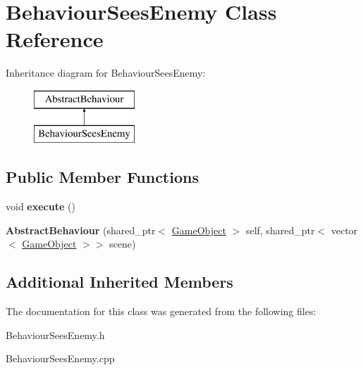 \hypertarget{class_behaviour_sees_enemy}{}\section{Behaviour\+Sees\+Enemy Class Reference}
\label{class_behaviour_sees_enemy}
Inheritance diagram for Behaviour\+Sees\+Enemy\+:\begin{figure}[H]
\begin{center}
\leavevmode
\includegraphics[height=2.000000cm]{class_behaviour_sees_enemy}
\end{center}
\end{figure}
\subsection*{Public Member Functions}
\begin{DoxyCompactItemize}
\item 
\mbox{\label{class_behaviour_sees_enemy_afddbf2ca7396c9fd7b24f4be60edb84c}} 
void {\bfseries execute} ()
\item 
\mbox{\label{class_behaviour_sees_enemy_a8a3a9217b3179f949a1d6a32f340c00c}} 
{\bfseries Abstract\+Behaviour} (shared\+\_\+ptr$<$ \mbox{\hyperlink{class_game_object}{Game\+Object}} $>$ self, shared\+\_\+ptr$<$ vector$<$ \mbox{\hyperlink{class_game_object}{Game\+Object}} $>$$>$ scene)
\end{DoxyCompactItemize}
\subsection*{Additional Inherited Members}


The documentation for this class was generated from the following files\+:\begin{DoxyCompactItemize}
\item 
Behaviour\+Sees\+Enemy.\+h\item 
Behaviour\+Sees\+Enemy.\+cpp\end{DoxyCompactItemize}
